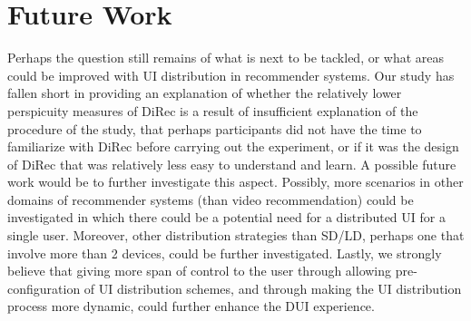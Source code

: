 \section{Future Work}
Perhaps the question still remains of what is next to be tackled, or what areas
could be improved with UI distribution in recommender systems. Our study has
fallen short in providing an explanation of whether the relatively lower
perspicuity measures of DiRec is a result of insufficient explanation of the
procedure of the study, that perhaps participants did not have the time to
familiarize with DiRec before carrying out the experiment, or if it was the
design of DiRec that was relatively less easy to understand and learn. A
possible future work would be to further investigate this aspect. Possibly, more
scenarios in other domains of recommender systems (than video recommendation)
could be investigated in which there could be a potential need for a distributed UI for a single user.
Moreover, other distribution strategies than SD/LD, perhaps one that involve
more than 2 devices, could be further investigated. Lastly, we strongly believe
that giving more span of control to the user through allowing pre-configuration
of UI distribution schemes, and through making the UI distribution process more
dynamic, could further enhance the DUI experience.

 

